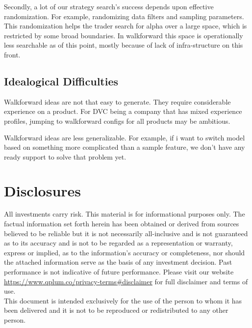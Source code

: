 \documentclass[a4paper]{article}
\begin{document}
	
	Secondly, a lot of our strategy search's success depends upon effective randomization. For example, randomizing data filters and sampling parameters. This randomization helps the trader search for alpha over a large space, which is restricted by some broad boundaries. In walkforward this space is operationally less searchable as of this point, mostly because of lack of infra-structure on this front.
	
	\subsection{Idealogical Difficulties}
	Walkforward ideas are not that easy to generate. They require considerable experience on a product. For DVC being a company that has mixed experience profiles, jumping to walkforward configs for all products may be ambitious.  
	
	Walkforward ideas are less generalizable. For example, if i want to switch model based on something more complicated than a sample feature, we don't have any ready support to solve that problem yet.
	
	
	
	\newpage
	\section{Disclosures \label{disclosures} }
	All investments carry risk. This material is for informational purposes only. The factual information set forth herein has been obtained or derived from sources believed to be reliable but it is not necessarily all-inclusive and is not guaranteed as to its accuracy and is not to be regarded as a representation or warranty, express or implied, as to the information’s accuracy or completeness, nor should the attached information serve as the basis of any investment decision. Past performance is not indicative of future performance. Please visit our website \url{https://www.qplum.co/privacy-terms#disclaimer} for full disclaimer and terms of use.\\
	This document is intended exclusively for the use of the person to whom it has been delivered and it is not to be reproduced or redistributed to any other person.
	
\end{document}
